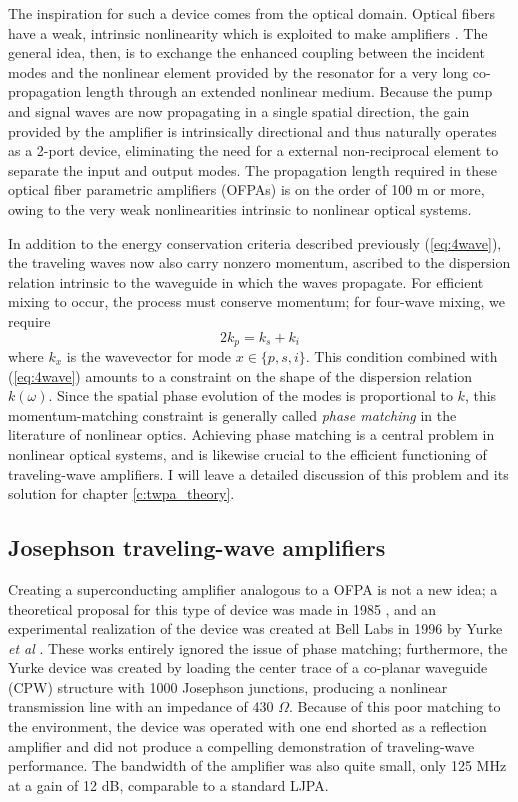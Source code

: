 The inspiration for such a device comes from the optical domain.  Optical fibers have a weak, intrinsic nonlinearity which is exploited to make amplifiers \cite{Hansryd:2015uq}.  The general idea, then, is to exchange the enhanced coupling between the incident modes and the nonlinear element provided by the resonator for a very long co-propagation length through an extended nonlinear medium.  Because the pump and signal waves are now propagating in a single spatial direction, the gain provided by the amplifier is intrinsically directional and thus naturally operates as a 2-port device, eliminating the need for a external non-reciprocal element to separate the input and output modes.  The propagation length required in these optical fiber parametric amplifiers (OFPAs) is on the order of 100 m or more, owing to the very weak nonlinearities intrinsic to nonlinear optical systems.

In addition to the energy conservation criteria described previously (\ref{eq:4wave}), the traveling waves now also carry nonzero momentum, ascribed to the dispersion relation intrinsic to the waveguide in which the waves propagate.  For efficient mixing to occur, the process must conserve momentum; for four-wave mixing, we require
\begin{equation}
2 k_p = k_s + k_i
\label{eq:4wave_phase}
\end{equation}
where $k_x$ is the wavevector for mode $x \in \{p,s,i\}$.  This condition combined with (\ref{eq:4wave}) amounts to a constraint on the shape of the dispersion relation $k(\omega)$.  Since the spatial phase evolution of the modes is proportional to $k$, this momentum-matching constraint is generally called \textit{phase matching} in the literature of nonlinear optics.  Achieving phase matching is a central problem in nonlinear optical systems, and is likewise crucial to the efficient functioning of traveling-wave amplifiers.  I will leave a detailed discussion of this problem and its solution for chapter \ref{c:twpa_theory}.

\subsection{Josephson traveling-wave amplifiers}

Creating a superconducting amplifier analogous to a OFPA is not a new idea; a theoretical proposal for this type of device was made in 1985 \cite{Sweeny1985}, and an experimental realization of the device was created at Bell Labs in 1996 by Yurke \textit{et al} \cite{Yurke:1996ys}.  These works entirely ignored the issue of phase matching; furthermore, the Yurke device was created by loading the center trace of a co-planar waveguide (CPW) structure with 1000 Josephson junctions, producing a nonlinear transmission line with an impedance of 430 $\Omega$.  Because of this poor matching to the environment, the device was operated with one end shorted as a reflection amplifier and did not produce a compelling demonstration of traveling-wave performance.  The bandwidth of the amplifier was also quite small, only 125 MHz at a gain of 12 dB, comparable to a standard LJPA.

